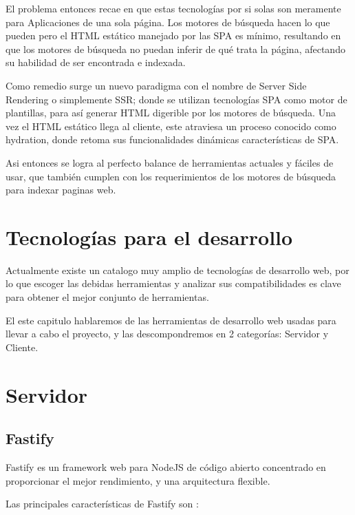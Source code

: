 El problema entonces recae en que estas tecnologías por si solas son meramente para Aplicaciones de una sola página. Los motores de búsqueda hacen lo que pueden pero el HTML estático manejado por las SPA es mínimo, resultando en que los motores de búsqueda no puedan inferir de qué trata la página, afectando su habilidad de ser encontrada e indexada.

Como remedio surge un nuevo paradigma con el nombre de Server Side Rendering o simplemente SSR; donde se utilizan  tecnologías SPA como motor de plantillas, para así generar HTML digerible por los motores de búsqueda. Una vez el HTML estático llega al cliente, este atraviesa un proceso conocido como hydration, donde retoma sus funcionalidades dinámicas características de SPA.

Asi entonces se logra al perfecto balance de herramientas actuales y fáciles de usar, que también cumplen con los requerimientos de los motores de búsqueda para indexar paginas web.

\section{Tecnologías para el desarrollo}

Actualmente existe un catalogo muy amplio de tecnologías de desarrollo web, por lo que escoger las debidas herramientas y analizar sus compatibilidades es clave para obtener el mejor conjunto de herramientas.

El este capitulo hablaremos de las herramientas de desarrollo web usadas para llevar a cabo el proyecto, y las descompondremos en 2 categorías: Servidor y Cliente.

\section{Servidor}

\subsection{Fastify}

Fastify es un framework web para NodeJS de código abierto concentrado en proporcionar el mejor rendimiento, y una arquitectura flexible. 

Las principales características de Fastify son \cite{FastifyCoreFeatures}:

